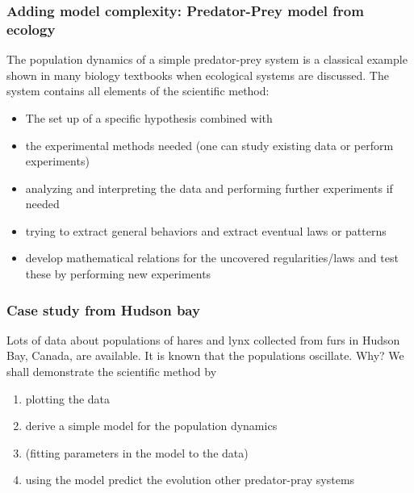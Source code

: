 \documentclass{beamer}
\begin{document}
\begin{frame}
\frametitle{Adding model complexity: Predator-Prey model from ecology}

\begin{block}{}
The population dynamics of a simple predator-prey system is a
classical example shown in many biology textbooks when ecological
systems are discussed. The system contains all elements of the
scientific method:

\begin{itemize}
 \item The set up of a specific hypothesis combined with

 \item the experimental methods needed (one can study existing data or perform experiments)

 \item analyzing and interpreting the data and performing further experiments if needed

 \item trying to extract general behaviors and extract eventual laws or patterns

 \item develop mathematical relations for the uncovered regularities/laws and test these by performing new experiments
\end{itemize}

\noindent
\end{block}
\end{frame}

\begin{frame}
\frametitle{Case study from Hudson bay}

\begin{block}{}
Lots of data about populations of hares and lynx collected from furs in Hudson Bay, Canada, are available. It is known that the populations oscillate. Why?
We shall demonstrate the scientific method by

\begin{enumerate}
\item plotting the data

\item derive a simple model for the population dynamics

\item (fitting parameters in the model to the data)

\item using the model predict the evolution other predator-pray systems
\end{enumerate}

\noindent
\end{block}
\end{frame}
\end{document}
